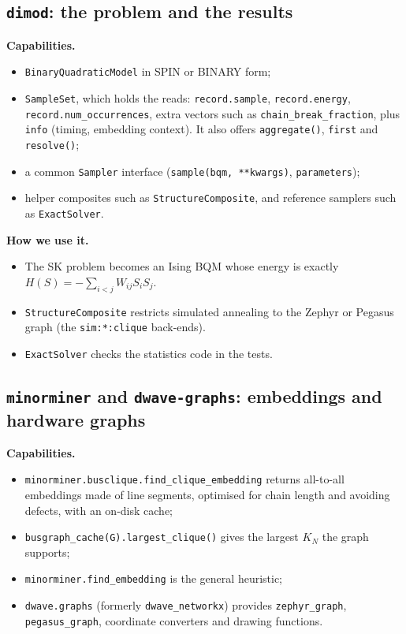 \documentclass[11pt,a4paper]{article}
\newcommand{\code}[1]{\nolinkurl{#1}}
\newcommand{\src}[4]{}
\begin{document}
\src{skgame/optim/backends.py}{\rHardwareA}{\rHardwareB}{building the child sampler (QPU, embedded simulator or logical simulator) and reading its hardware graph}

\subsection{\texorpdfstring{\code{dimod}}{dimod}: the problem and the results}
\textbf{Capabilities.}
\begin{itemize}
\item \code{BinaryQuadraticModel} in SPIN or BINARY form;
\item \code{SampleSet}, which holds the reads: \code{record.sample}, \code{record.energy}, \code{record.num_occurrences}, extra vectors such as \code{chain_break_fraction}, plus \code{info} (timing, embedding context). It also offers \code{aggregate()}, \code{first} and \code{resolve()};
\item a common \code{Sampler} interface (\code{sample(bqm, **kwargs)}, \code{parameters});
\item helper composites such as \code{StructureComposite}, and reference samplers such as \code{ExactSolver}.
\end{itemize}

\textbf{How we use it.}
\begin{itemize}
\item The SK problem becomes an Ising BQM whose energy is exactly $H(S)=-\sum_{i<j}W_{ij}S_iS_j$.
\item \code{StructureComposite} restricts simulated annealing to the Zephyr or Pegasus graph (the \code{sim:*:clique} back-ends).
\item \code{ExactSolver} checks the statistics code in the tests.
\end{itemize}
\src{skgame/optim/problem.py}{\rTobqmA}{\rTobqmB}{the SK problem as a dimod BQM ($h=0$, $J_{ij}=-W_{ij}$)}

\subsection{\texorpdfstring{\code{minorminer}}{minorminer} and \texorpdfstring{\code{dwave-graphs}}{dwave-graphs}: embeddings and hardware graphs}
\textbf{Capabilities.}
\begin{itemize}
\item \code{minorminer.busclique.find_clique_embedding} returns all-to-all embeddings made of line segments, optimised for chain length and avoiding defects, with an on-disk cache;
\item \code{busgraph_cache(G).largest_clique()} gives the largest $K_N$ the graph supports;
\item \code{minorminer.find_embedding} is the general heuristic;
\item \code{dwave.graphs} (formerly \code{dwave_networkx}) provides \code{zephyr_graph}, \code{pegasus_graph}, coordinate converters and drawing functions.
\end{itemize}
\end{document}
